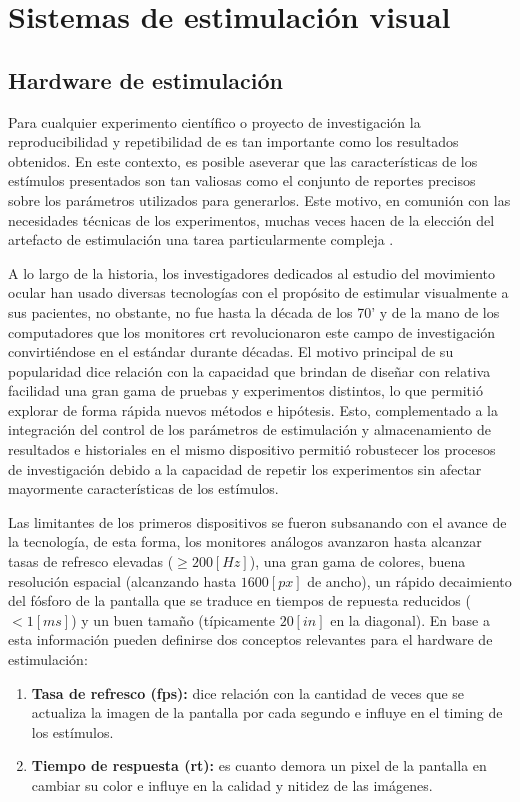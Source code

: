 \documentclass[../main.tex]{subfiles}
\begin{document}
	\section{Sistemas de estimulación visual}
	\label{sec:02_sistemas_de_estimulacion_visual}
		\subsection{Hardware de estimulación}
		\label{sub:02_hardware_de_estimulacion}

		Para cualquier experimento científico o proyecto de investigación la reproducibilidad y repetibilidad de es tan importante como los resultados obtenidos. En este contexto, es posible aseverar que las características de los estímulos presentados son tan valiosas como el conjunto de reportes precisos sobre los parámetros utilizados para generarlos. Este motivo, en comunión con las necesidades técnicas de los experimentos, muchas veces hacen de la elección del artefacto de estimulación una tarea particularmente compleja \cite{article:monitor_beuer}.

		A lo largo de la historia, los investigadores dedicados al estudio del movimiento ocular han usado diversas tecnologías con el propósito de estimular visualmente a sus pacientes, no obstante, no fue hasta la década de los 70' y de la mano de los computadores que los monitores \acrshort{crt} revolucionaron este campo de investigación convirtiéndose en el estándar durante décadas. El motivo principal de su popularidad dice relación con la capacidad que brindan de diseñar con relativa facilidad una gran gama de pruebas y experimentos distintos, lo que permitió explorar de forma rápida nuevos métodos e hipótesis. Esto, complementado a la integración del control de los parámetros de estimulación y almacenamiento de resultados e historiales en el mismo dispositivo permitió robustecer los procesos de investigación debido a la capacidad de repetir los experimentos sin afectar mayormente características de los estímulos. 

		Las limitantes de los primeros dispositivos se fueron subsanando con el avance de la tecnología, de esta forma, los monitores análogos avanzaron hasta alcanzar tasas de refresco elevadas ($\geq 200[Hz]$), una gran gama de colores, buena resolución espacial (alcanzando hasta $1600[px]$ de ancho), un rápido decaimiento del fósforo de la pantalla que se traduce en tiempos de repuesta reducidos ($< 1[ms]$) y un buen tamaño (típicamente $20[in]$ en la diagonal). En base a esta información pueden definirse dos conceptos relevantes para el hardware de estimulación: 
		\begin{enumerate}
			\item \textbf{Tasa de refresco (\acrshort{fps}):} dice relación con la cantidad de veces que se actualiza la imagen de la pantalla por cada segundo e influye en el timing de los estímulos.
			\item \textbf{Tiempo de respuesta (\acrshort{rt}):} es cuanto demora un pixel de la pantalla en cambiar su color e influye en la calidad y nitidez de las imágenes. 
		\end{enumerate}
\end{document}
